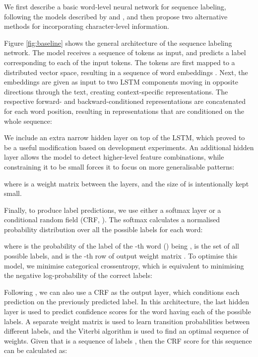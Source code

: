 \documentclass[11pt]{article}
\begin{document}
We first describe a basic word-level neural network for sequence labeling, following the models described by  and , and then propose two alternative methods for incorporating character-level information.

Figure \ref{fig:baseline} shows the general architecture of the sequence labeling network. The model receives a sequence of tokens  as input, and predicts a label corresponding to each of the input tokens.
The tokens are first mapped to a distributed vector space, resulting in a sequence of word embeddings .
Next, the embeddings are given as input to two LSTM \cite{Hochreiter1997} components moving in opposite directions through the text, creating context-specific representations. The respective forward- and backward-conditioned representations are concatenated for each word position, resulting in representations that are conditioned on the whole sequence:



We include an extra narrow hidden layer on top of the LSTM, which proved to be a useful modification based on development experiments. An additional hidden layer allows the model to detect higher-level feature combinations, while constraining it to be small forces it to focus on more generalisable patterns:



\noindent where  is a weight matrix between the layers, and the size of  is intentionally kept small.

Finally, to produce label predictions, we use either a softmax layer or a conditional random field (CRF, ). The softmax calculates a normalised probability distribution over all the possible labels for each word:



\noindent where  is the probability of the label of the -th word () being ,  is the set of all possible labels, and  is the -th row of output weight matrix . To optimise this model, we minimise categorical crossentropy, which is equivalent to minimising the negative log-probability of the correct labels:



Following , we can also use a CRF as the output layer, which conditions each prediction on the previously predicted label. In this architecture, the last hidden layer is used to predict confidence scores for the word having each of the possible labels. A separate weight matrix is used to learn transition probabilities between different labels, and the Viterbi algorithm is used to find an optimal sequence of weights. Given that  is a sequence of labels , then the CRF score for this sequence can be calculated as:
\end{document}

